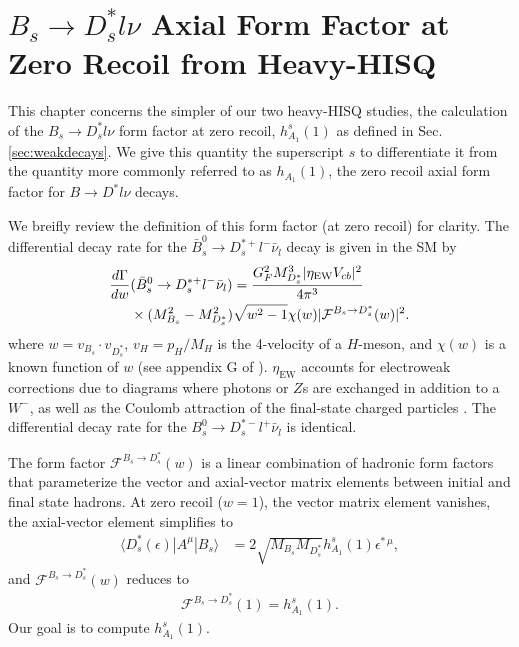 \chapter{$B_s\to D_s^*l\nu$ Axial Form Factor at Zero Recoil from Heavy-HISQ}
\label{chap:BsDsstar}

This chapter concerns the simpler of our two heavy-HISQ studies, the calculation of the $B_s\to D^*_sl\nu$ form factor at zero recoil, $h^s_{A_1}(1)$ as defined in Sec. \ref{sec:weakdecays}. We give this quantity the superscript $s$ to differentiate it from the quantity more commonly referred to as $h_{A_1}(1)$, the zero recoil axial form factor for $B\to D^*l\nu$ decays.

We breifly review the definition of this form factor (at zero recoil) for clarity. The differential decay rate for the $\bar{B}_s^0\to D_s^{*+} l^- \bar{\nu}_l$ decay is given in the SM by
\begin{align}
  {d \Gamma \over dw} &(\bar{B}_s^0\to D_s^{*+} l^- \bar{\nu}_l) = {G_F^2 M_{D_s^*}^3 | \eta_{\text{EW}} V_{cb} |^2 \over 4\pi^3}
\\  &\times(M_{B_s}^2-M_{D_s^*}^2) \sqrt{w^2-1} \chi(w) | \mathcal{F}^{B_s\to D_s^*}(w) |^2. \nonumber
\end{align}
where $w = v_{B_s} \cdot v_{D^*_s}$, $v_H = p_H/M_H$ is the 4-velocity of a $H$-meson, and $\chi(w)$ is a known function of $w$ (see appendix G of \cite{Harrison:2017fmw}). $\eta_{\text{EW}}$ accounts for electroweak corrections due to diagrams where photons or $Z$s are exchanged in addition to a $W^-$, as well as the Coulomb attraction of the final-state charged particles \cite{SIRLIN198283,Ginsberg1968,PhysRevD.41.1736}. The differential decay rate for the $B_s^0\to D_s^{*-} l^+ \bar{\nu}_l$ is identical.

The form factor $\mathcal{F}^{B_s\to D_s^*}(w)$ is a linear combination of hadronic form factors that parameterize the vector and axial-vector matrix elements between initial and final state hadrons. At zero recoil ($w=1$), the vector matrix element vanishes, the axial-vector element simplifies to
\begin{align}
  \langle D^*_s(\epsilon)| A^{\mu} | B_s \rangle &= 2 \sqrt{M_{B_s}M_{D^*_s}} h^s_{A_1}(1) \epsilon^{*\,\mu},
\end{align}
and $\mathcal{F}^{B_s\to D_s^*}(w)$ reduces to
\begin{align}
  \mathcal{F}^{B_s\to D_s^*}(1) = h^s_{A_1}(1).
\end{align}
Our goal is to compute $h^s_{A_1}(1)$.

